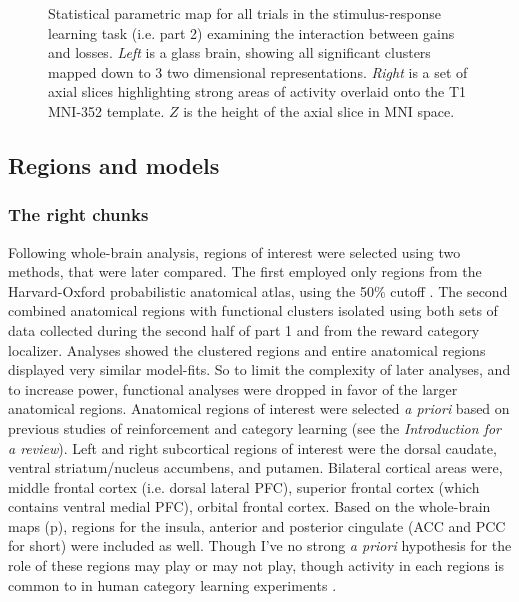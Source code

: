 \documentclass[doc,12pt]{apa}        %
\begin{document}
\begin{figure}[tp]
    \centering
	\caption{Statistical parametric map for all trials in the stimulus-response learning task (i.e. part 2) examining the interaction between gains and losses.  \emph{Left} is a glass brain, showing all significant clusters mapped down to 3 two dimensional representations.  \emph{Right} is a set of axial slices highlighting strong areas of activity overlaid onto the T1 MNI-352 template.  $Z$ is the height of the axial slice in MNI space.}
	\label{fig:gxl}
\end{figure}

\subsection{Regions and models}
\label{sub:regoins}
\subsubsection{The right chunks}
\label{subsub:chunks}
Following whole-brain analysis, regions of interest were selected using two methods, that were later compared.  The first employed only regions from the Harvard-Oxford probabilistic anatomical atlas, using the 50\% cutoff \cite{Desikan:2006p9370}.  The second combined anatomical regions with functional clusters isolated using both sets of data collected during the second half of part 1 and from the reward category localizer.  Analyses showed the clustered regions and entire anatomical regions displayed very similar model-fits.  So to limit the complexity of later analyses, and to increase power, functional analyses were dropped in favor of the larger anatomical regions.  Anatomical regions of interest were selected \emph{a priori} based on previous studies of reinforcement and category learning (see the \emph{Introduction for a review}).  Left and right subcortical regions of interest were the dorsal caudate, ventral striatum/nucleus accumbens, and putamen.   Bilateral cortical areas were, middle frontal cortex (i.e. dorsal lateral PFC), superior frontal cortex (which contains ventral medial PFC), orbital frontal cortex.  Based on the whole-brain maps (p\pageref{sub:blob}), regions for the insula, anterior and posterior cingulate (ACC and PCC for short) were included as well.  Though I've no strong \emph{a priori} hypothesis for the role of these regions may play or may not play, though activity in each regions is common to in human category learning experiments \cite{LopezPaniagua:2011p8296,Seger:2010p7188,Cincotta:2007p6672,Seger:2006p5447,Seger:2005pd}.
\end{document}

